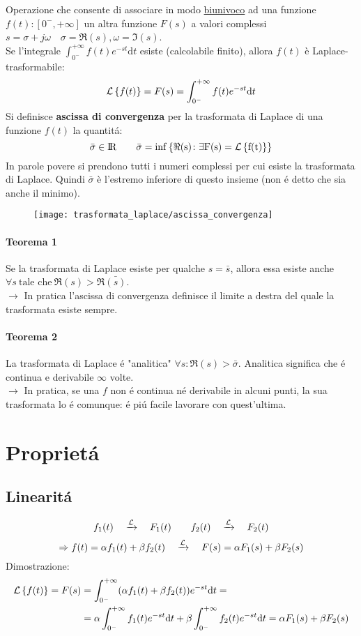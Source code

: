 \documentclass[../main.tex]{subfiles}
\begin{document}
	\label{sec:traformata_laplace}
	Operazione che consente di associare in modo \underline{biunivoco} ad una funzione $ f(t):\left[ 0^{-}, + \infty \right] $ un altra funzione $F(s)$ a valori complessi $ s = \sigma + j\omega \quad \sigma=\Re(s), \omega=\Im(s)$.\\
	\linebreak
	Se l'integrale $ \int_{0^{-}}^{+\infty}f(t)e^{-st} \mathrm{d}t $ esiste (calcolabile finito), allora $f(t)$ è Laplace-trasformabile:
	$$ \mathcal{L} \left\lbrace f(t) \right\rbrace = F(s) = \int_{0^{-}}^{+\infty} f(t) e^{- s t} \mathrm{d} t $$
	\linebreak
	Si definisce \textbf{ascissa di convergenza} per la trasformata di Laplace di una funzione $f(t)$ la quantit\'a:\\
	$$ \bar{\sigma} \in \rm I\!R \qquad \bar{\sigma} = inf\left\lbrace \Re{(s)} \colon \exists F(s) = \mathcal{L} \left\lbrace f(t) \right\rbrace \right\rbrace $$
	In parole povere si prendono tutti i numeri complessi per cui esiste la trasformata di Laplace. Quindi $ \bar{\sigma} $ è l'estremo inferiore di questo insieme (non \'e detto che sia anche il minimo).
	\begin{figure}[h!]
		\centering\texttt{[image: trasformata\_laplace/ascissa\_convergenza]}
	\end{figure}
	\paragraph{Teorema 1} Se la trasformata di Laplace esiste per qualche $s=\bar{s}$, allora essa esiste anche $ \forall s\ \text{tale che}\ \Re{(s)} > \Re{\bar{(s)}} $.\\
	$\rightarrow$ In pratica l'ascissa di convergenza definisce il limite a destra del quale la trasformata esiste sempre.
	\paragraph{Teorema 2} La trasformata di Laplace \'{e} "analitica" $ \forall s \colon \Re{(s)} > \bar{\sigma}$. Analitica significa che \'e continua e derivabile $\infty$ volte.\\
	$\rightarrow$ In pratica, se una $f$ non \'e continua n\'e derivabile in alcuni punti, la sua trasformata lo \'e comunque: \'e pi\'u facile lavorare con quest'ultima.
	\section{Propriet\'{a}}
	\subsection{Linearit\'{a}}
	\label{linear}
	$$ f_{1}(t) \quad \xrightarrow{\mathcal{L}} \quad F_{1}(t) \qquad f_{2}(t) \quad \xrightarrow{\mathcal{L}} \quad F_{2}(t) $$
	$$ \Rightarrow f(t)=\alpha f_{1}(t) + \beta f_{2}(t) \quad \xrightarrow{\mathcal{L}} \quad F(s)=\alpha F_{1}(s) + \beta F_{2}(s) $$
	Dimostrazione:
	\begin{align*}
		\mathcal{L} \left\lbrace f(t) \right\rbrace = F(s) &= \int_{0^{-}}^{+\infty} (\alpha f_{1}(t) + \beta f_{2}(t)) e^{- s t} \mathrm{d} t =\\
		&= \alpha \int_{0^{-}}^{+\infty} f_{1}(t) e^{- s t} \mathrm{d} t + \beta \int_{0^{-}}^{+\infty} f_{2}(t) e^{- s t} \mathrm{d} t = \alpha F_{1}(s) + \beta F_{2}(s)
	\end{align*}
\end{document}
